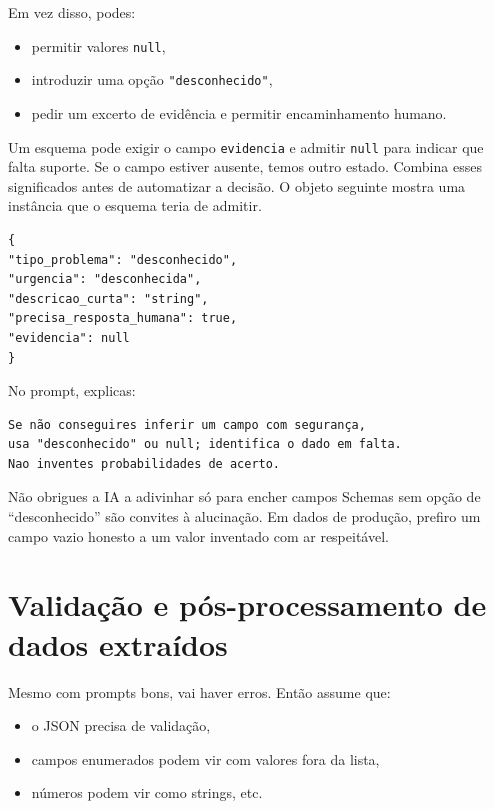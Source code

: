 Em vez disso, podes:

\begin{itemize}[leftmargin=*]
\item permitir valores \texttt{null},
\item introduzir uma opção \texttt{"desconhecido"},
\item pedir um excerto de evidência e permitir encaminhamento humano.
\end{itemize}

Um esquema pode exigir o campo \texttt{evidencia} e admitir \texttt{null} para indicar que falta suporte. Se o campo estiver ausente, temos outro estado. Combina esses significados antes de automatizar a decisão. O objeto seguinte mostra uma instância que o esquema teria de admitir.

\begin{lstlisting}
{
"tipo_problema": "desconhecido",
"urgencia": "desconhecida",
"descricao_curta": "string",
"precisa_resposta_humana": true,
"evidencia": null
}
\end{lstlisting}

No prompt, explicas:

\begin{lstlisting}
Se não conseguires inferir um campo com segurança,
usa "desconhecido" ou null; identifica o dado em falta.
Nao inventes probabilidades de acerto.
\end{lstlisting}

\begin{warningboxenv}{Não obrigues a IA a adivinhar só para encher campos}
Schemas sem opção de “desconhecido” são convites à alucinação. Em dados de produção, prefiro um campo vazio honesto a um valor inventado com ar respeitável.
\end{warningboxenv}

\section{Validação e pós-processamento de dados extraídos}

Mesmo com prompts bons, vai haver erros. Então assume que:

\begin{itemize}[leftmargin=*]
\item o JSON precisa de validação,
\item campos enumerados podem vir com valores fora da lista,
\item números podem vir como strings, etc.
\end{itemize}

